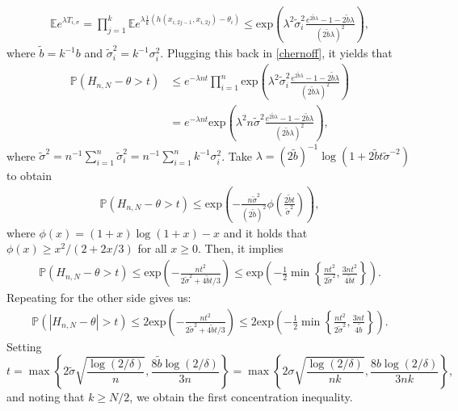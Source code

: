 \documentclass[preprint,11pt]{article}
\newcommand{\mbb}{\mathbb}
\numberwithin{equation}{section}
\begin{document}
    \begin{align*}
        \mbb{E}e^{\lambda T_{i,\sigma}}=\prod_{j=1}^{k}\mbb{E}e^{\lambda \frac{1}{k}(h(x_{i,2j-1},x_{i,2j})-\theta_i)}\le\text{exp}\left(\lambda^2\tilde{\sigma}_i^2\frac{e^{2\tilde{b}\lambda}-1-2\tilde{b}\lambda}{(2\tilde{b}\lambda)^2}\right),
    \end{align*}
    where $\tilde{b}=k^{-1}b$ and $\tilde{\sigma}_i^2=k^{-1}\sigma_i^2$. Plugging this back in \eqref{chernoff}, it yields that
    \begin{align*}
        \mbb{P}(H_{n,N}-\theta>t)&\le e^{-\lambda nt}\prod_{i=1}^{n}\text{exp}\left(\lambda^2\tilde{\sigma}_i^2\frac{e^{2\tilde{b}\lambda}-1-2\tilde{b}\lambda}{(2\tilde{b}\lambda)^2}\right)\\
        &=e^{-\lambda nt}\text{exp}\left(\lambda^2n\tilde{\sigma}^2\frac{e^{2\tilde{b}\lambda}-1-2\tilde{b}\lambda}{(2\tilde{b}\lambda)^2}\right),
    \end{align*}
    where $\tilde{\sigma}^2=n^{-1}\sum_{i=1}^{n}\tilde{\sigma}_i^2=n^{-1}\sum_{i=1}^{n}k^{-1}\sigma_i^2$. Take $\lambda=(2\tilde{b})^{-1}\log\left(1+2\tilde{b}t\tilde{\sigma}^{-2}\right)$ to obtain
    \begin{align*}
         \mbb{P}(H_{n,N}-\theta>t)\le\text{exp}\left(-\frac{n\tilde{\sigma}^2}{(2\tilde{b})^2}\phi\left(\frac{2\tilde{b}t}{\tilde{\sigma}^2}\right)\right),
    \end{align*}
    where $\phi(x)=(1+x)\log(1+x)-x$ and it holds that $\phi(x)\ge x^2/(2+2x/3)$ for all $x\ge 0$. Then, it implies
    \begin{align*}
        \mbb{P}(H_{n,N}-\theta>t)\le\text{exp}\left(-\frac{nt^2}{2\tilde{\sigma}^2+4\tilde{b}t/3}\right)\le \text{exp}\left(-\frac{1}{2}\min\left\{\frac{nt^2}{2\tilde{\sigma}^2},\frac{3nt^2}{4\tilde{b}t}\right\}\right).
    \end{align*}
    Repeating for the other side gives us:
    \begin{align}\label{twosidebound}
        \mbb{P}(|H_{n,N}-\theta|>t)\le 2\text{exp}\left(-\frac{nt^2}{2\tilde{\sigma}^2+4\tilde{b}t/3}\right)\le 2\text{exp}\left(-\frac{1}{2}\min\left\{\frac{nt^2}{2\tilde{\sigma}^2},\frac{3nt}{4\tilde{b}}\right\}\right).
    \end{align}
    Setting $$t=\max\left\{2\tilde{\sigma}\sqrt{\frac{\log(2/\delta)}{n}},\frac{8\tilde{b}\log(2/\delta)}{3n}\right\}=\max\left\{2\sigma\sqrt{\frac{\log(2/\delta)}{nk}},\frac{8b\log(2/\delta)}{3nk}\right\},$$ 
    and noting that $k\ge N/2$, we obtain the first concentration inequality.
\end{document}
